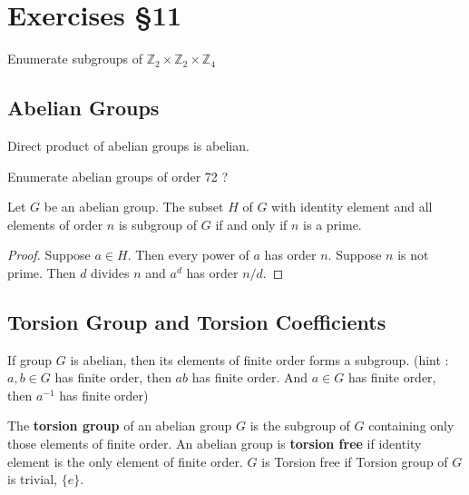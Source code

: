 \section{Exercises \S11}

\begin{question}
	Enumerate subgroups of $\mathbb{Z}_2 \times \mathbb{Z}_2 \times \mathbb{Z}_4$
\end{question}

\subsection{Abelian Groups}
\begin{remark}
Direct product of abelian groups is abelian.%
\end{remark}

\begin{question}
	Enumerate abelian groups of order 72 ?
\end{question}

\begin{remark}
	Let $G$ be an abelian group.
	The subset $H$ of $G$ with identity element and all elements of order $n$ is subgroup of $G$ if and only if $n$ is a prime.%
\end{remark}
\begin{proof}
	Suppose $a \in H$.
	Then every power of $a$ has order $n$.
	Suppose $n$ is not prime.
	Then $d$ divides $n$ and $a^d$ has order $n/d$.
\end{proof}

\subsection{Torsion Group and Torsion Coefficients}
\begin{remark}
If group $G$ is abelian, then its elements of finite order forms a subgroup.%
(hint : $a,b \in G$ has finite order, then $ab$ has finite order. And $a \in G$ has finite order, then $a^{-1}$ has finite order)
\end{remark}
\begin{definition} 
	The \textbf{torsion group} of an abelian group $G$ is the subgroup of $G$ containing only those elements of finite order.%
	An abelian group is \textbf{torsion free} if identity element is the only element of finite order.
	$G$ is Torsion free if Torsion group of $G$ is trivial, $\{ e \}$.%
\end{definition}

